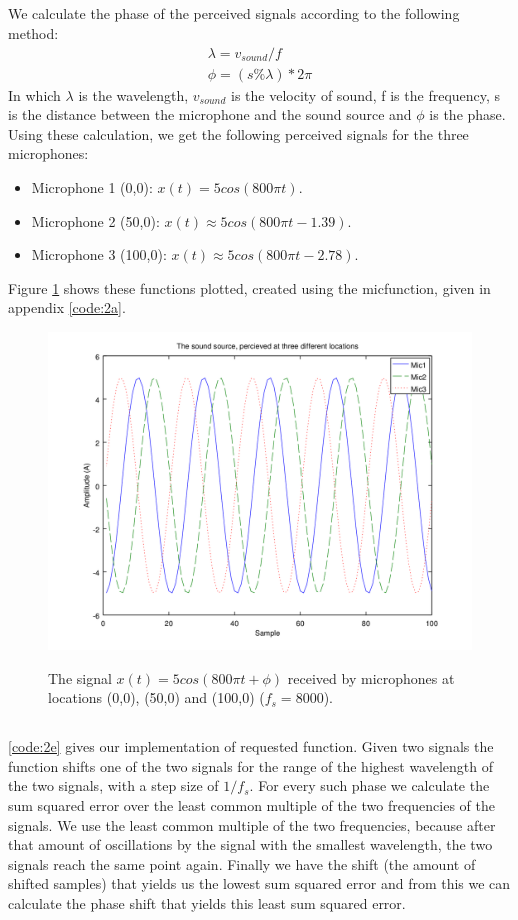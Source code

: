\documentclass{article}
\begin{document}
\subsection{}
We calculate the phase of the perceived signals according to the following method:
\begin{align}
 \lambda = v_{sound} / f \\
 \phi = (s \% \lambda) * 2\pi
\end{align}
In which $\lambda$ is the wavelength, $v_{sound}$ is the velocity of sound, f is the frequency, s is the distance between the 
microphone and the sound source and $\phi$ is the phase.
Using these calculation, we get the following perceived signals for the three microphones:
\begin{itemize}
 \item Microphone 1 (0,0): $x(t) = 5cos(800 \pi t)$.
 \item Microphone 2 (50,0): $x(t) \approx 5cos(800 \pi t - 1.39)$.
 \item Microphone 3 (100,0): $x(t) \approx 5cos(800 \pi t - 2.78)$.
\end{itemize}
Figure \ref{fig2d} shows these functions plotted, created using the micfunction, given in appendix \autoref{code:2a}.
\begin{figure}[H]
  \centering
  \includegraphics[width=0.7\columnwidth]{plot2D.png}\\
  \caption{The signal $x(t) = 5cos(800 \pi t + \phi)$ received by microphones at locations (0,0), (50,0) and (100,0) ($f_s = 8000$).}
  \label{fig2d}
\end{figure}

\subsection{}
\autoref{code:2e} gives our implementation of requested function. Given two signals the function shifts one of the two signals
for the range of the highest wavelength of the two signals, with a step size of $1/f_s$. For every such phase we calculate the sum squared error over the least common multiple of the two frequencies of the signals.
We use the least common multiple of the two frequencies, because after that amount of oscillations by the signal with the smallest
wavelength, the two signals reach the same point again. Finally we have the shift (the amount of shifted samples) that yields us the lowest sum squared error and
from this we can calculate the phase shift that yields this least sum squared error.
\end{document}
